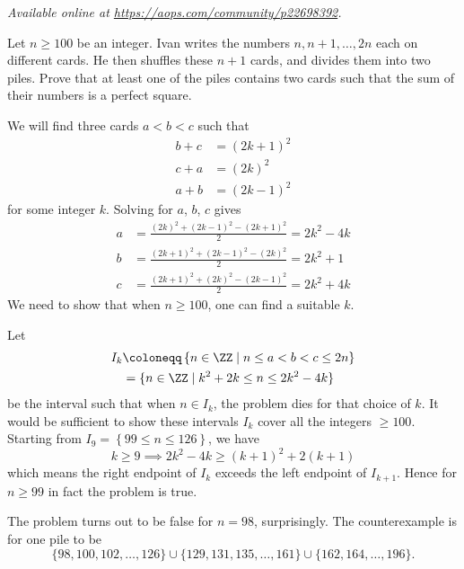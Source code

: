 \textsl{Available online at \url{https://aops.com/community/p22698392}.}
\begin{mdframed}[style=mdpurplebox,frametitle={Problem statement}]
Let $n \ge 100$ be an integer.
Ivan writes the numbers $n, n+1, \dots, 2n$ each on different cards.
He then shuffles these $n+1$ cards, and divides them into two piles.
Prove that at least one of the piles contains two cards such that
the sum of their numbers is a perfect square.
\end{mdframed}
We will find three cards $a < b < c$ such that
\begin{align*}
  b+c &= (2k+1)^2 \\
  c+a &= (2k)^2 \\
  a+b &= (2k-1)^2
\end{align*}
for some integer $k$.
Solving for $a$, $b$, $c$ gives
\begin{align*}
  a &= \frac{(2k)^2+(2k-1)^2-(2k+1)^2}{2} = 2k^2 - 4k \\
  b &= \frac{(2k+1)^2+(2k-1)^2-(2k)^2}{2} = 2k^2 + 1 \\
  c &= \frac{(2k+1)^2+(2k)^2-(2k-1)^2}{2} = 2k^2 + 4k
\end{align*}
We need to show that when $n \ge 100$, one can find a suitable $k$.

Let
\begin{align*}
  I_k &\coloneqq \left\{ n \in \ZZ \mid n \le a < b < c \le 2n \right\} \\
  &= \{ n \in \ZZ \mid k^2+2k \le n \le  2k^2-4k \}
\end{align*}
be the interval such that when $n \in I_k$,
the problem dies for that choice of $k$.
It would be sufficient to show these intervals $I_k$
cover all the integers $\ge 100$.
Starting from $I_9 = \left\{ 99 \le n \le 126 \right\}$,
we have
\[ k \ge 9 \implies 2k^2 - 4k \ge (k+1)^2 + 2(k+1) \]
which means the right endpoint of $I_k$
exceeds the left endpoint of $I_{k+1}$.
Hence for $n \ge 99$ in fact the problem is true.

\begin{remark*}
  The problem turns out to be false for $n = 98$, surprisingly.
  The counterexample is for one pile to be
  \[ \{98,100,102,\dots,126\}
    \cup \{129,131,135,\dots,161 \}
    \cup \{162, 164, \dots, 196\}. \]
\end{remark*}
\pagebreak